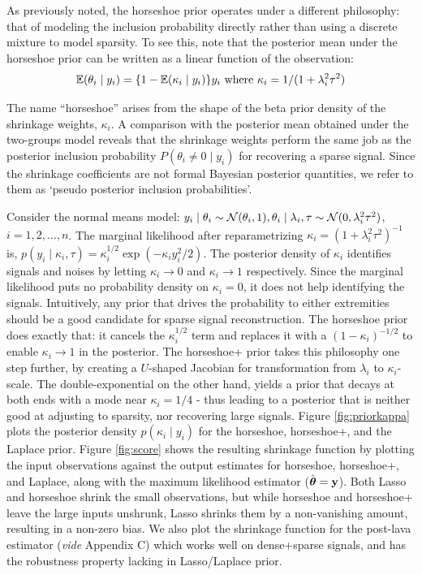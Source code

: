 \documentclass[sts,preprint]{imsart}
\begin{document}
As previously noted, the horseshoe prior operates under a different philosophy:
that of modeling the inclusion probability directly rather than using a
discrete mixture to model sparsity. To see this, note that the posterior mean
under the horseshoe prior can be written as a linear function of the
observation:
\begin{equation}
\mathbb E(\theta_i \mid y_i) = \{1- \mathbb E(\kappa_i \mid y_i) \} y_i \text{ where } \kappa_i = 1/(1+\lambda_i^2 \tau^2)
\end{equation}

The name ``horseshoe'' arises from the shape of the beta prior density of the shrinkage weights, $\kappa_i$. A comparison with the posterior mean obtained under the two-groups model reveals that the shrinkage weights perform the same job as the posterior inclusion probability $P(\theta_i \ne 0 \mid y_i)$ for recovering a sparse signal. Since the shrinkage coefficients are not formal Bayesian posterior
quantities, we refer to them as `pseudo posterior inclusion probabilities'.

Consider the normal means model: $y_i \mid \theta_i \sim {\cal N}(\theta_i,1), \theta_i \mid \lambda_i, \tau \sim {\cal N}(0, \lambda_i^2 \tau^2)$, $i = 1,2, \ldots, n$. The marginal likelihood after reparametrizing $\kappa_i = (1+\lambda_i^2\tau^2)^{-1}$ is,  $p(y_i \mid \kappa_i, \tau) = \kappa_i^{1/2} \exp \left(-\kappa_i y_i^2/2 \right)$. The posterior density of $\kappa_i$ identifies signals and noises by letting $\kappa_i \to 0$ and $\kappa_i \to 1$ respectively. Since the marginal likelihood puts no probability density on $\kappa_i = 0$, it does not help identifying the signals. Intuitively, any prior that drives the probability to either extremities should be a good candidate for sparse signal reconstruction. The horseshoe prior does exactly that: it cancels the $\kappa_i^{1/2}$ term and replaces it with a $(1-\kappa_i)^{-1/2}$ to enable $\kappa_i \to 1$ in the posterior. The horseshoe+ prior \citep{bhadra2015horseshoe+} takes this philosophy one step further, by creating a $U$-shaped Jacobian for transformation from $\lambda_i$ to $\kappa_i$-scale. The double-exponential on the other hand, yields a prior that decays at both ends with a mode near $\kappa_i = 1/4$ - thus leading to a posterior that is neither good at adjusting to sparsity, nor recovering large signals. 
Figure \ref{fig:priorkappa} plots the posterior density $p(\kappa_i \mid y_i)$ for the horseshoe, horseshoe+, and the Laplace prior. Figure \ref{fig:score} shows the resulting shrinkage function by plotting the input observations against the output estimates for horseshoe, horseshoe+, and Laplace, along with the maximum likelihood estimator ($\hat{\boldsymbol{\theta}} = {\bf y}$). Both Lasso and horseshoe shrink the small observations, but while horseshoe and horseshoe+ leave the large inputs unshrunk, Lasso shrinks them by a non-vanishing amount, resulting in a non-zero bias. We also plot the shrinkage function for the post-lava estimator \citep{chernozhukov2017lava} (\textit{vide} Appendix C) which works well on dense+sparse signals, and has the robustness property lacking in Lasso/Laplace prior. 
\end{document}
